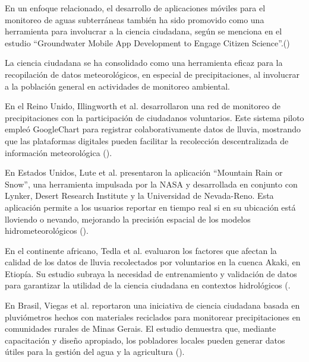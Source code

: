 En un enfoque relacionado, el desarrollo de aplicaciones móviles para el monitoreo de aguas subterráneas también ha sido promovido como una herramienta para involucrar a la ciencia ciudadana, según se menciona en el estudio ``Groundwater Mobile App Development to Engage Citizen Science''.(\cite{dennis2019groundwater})


















La ciencia ciudadana se ha consolidado como una herramienta eficaz para la recopilación de datos meteorológicos, en especial de precipitaciones, al involucrar a la población general en actividades de monitoreo ambiental.

En el Reino Unido, Illingworth et al. desarrollaron una red de monitoreo de precipitaciones con la participación de ciudadanos voluntarios. Este sistema piloto empleó GoogleChart para registrar colaborativamente datos de lluvia, mostrando que las plataformas digitales pueden facilitar la recolección descentralizada de información meteorológica  (\cite{illingworth2021ukprecipitation}).

En Estados Unidos, Lute et al. presentaron la aplicación ``Mountain Rain or Snow'', una herramienta impulsada por la NASA y desarrollada en conjunto con Lynker, Desert Research Institute y la Universidad de Nevada-Reno. Esta aplicación permite a los usuarios reportar en tiempo real si en su ubicación está lloviendo o nevando, mejorando la precisión espacial de los modelos hidrometeorológicos  (\cite{lute2021enhancing}).

En el continente africano, Tedla et al. evaluaron los factores que afectan la calidad de los datos de lluvia recolectados por voluntarios en la cuenca Akaki, en Etiopía. Su estudio subraya la necesidad de entrenamiento y validación de datos para garantizar la utilidad de la ciencia ciudadana en contextos hidrológicos  (\cite{tedla2022evaluation}.

En Brasil, Viegas et al. reportaron una iniciativa de ciencia ciudadana basada en pluviómetros hechos con materiales reciclados para monitorear precipitaciones en comunidades rurales de Minas Gerais. El estudio demuestra que, mediante capacitación y diseño apropiado, los pobladores locales pueden generar datos útiles para la gestión del agua y la agricultura  (\cite{viegas2023citizen}).

